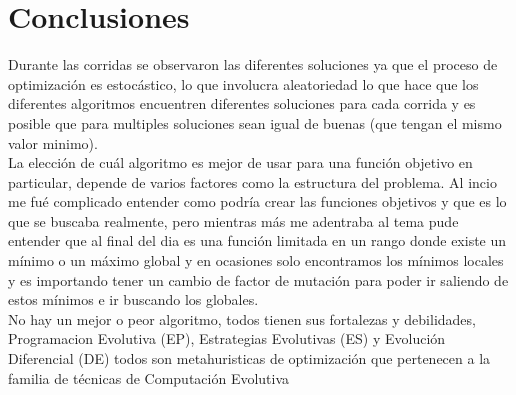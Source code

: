 \documentclass{article}
\begin{document}
\section{Conclusiones}

Durante las corridas se observaron las diferentes soluciones ya que el proceso de optimización es estocástico, lo que involucra aleatoriedad lo que hace que los diferentes algoritmos encuentren diferentes soluciones para cada corrida y es posible que para multiples soluciones sean igual de buenas (que tengan el mismo valor minimo).\\

La elección de cuál algoritmo es mejor de usar para una función objetivo en particular, depende de varios factores como la estructura del problema. Al incio me fué complicado entender como podría crear las funciones objetivos y que es lo que se buscaba realmente, pero mientras más me adentraba al tema pude entender que al final del dia es una función limitada en un rango donde existe un mínimo o un máximo global y en ocasiones solo encontramos los mínimos locales y es importando tener un cambio de factor de mutación para poder ir saliendo de estos mínimos e ir buscando los globales.\\

No hay un mejor o peor algoritmo, todos tienen sus fortalezas y debilidades, Programacion Evolutiva (EP), Estrategias Evolutivas (ES) y Evolución Diferencial (DE) todos son metahuristicas de optimización que pertenecen a la familia de técnicas de Computación Evolutiva\\
\end{document}
